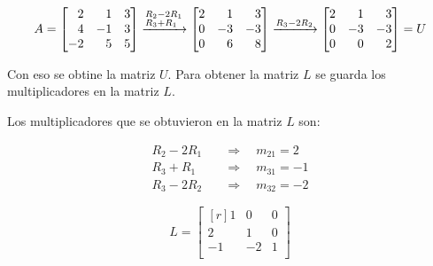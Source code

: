 \documentclass[../main.tex]{subfiles}
\begin{document}
        \begin{equation}
            A = \begin{bmatrix*}[r]
                    2 & 1 & 3 \\
                    4 & -1 & 3 \\
                    -2 & 5 & 5 \\
                \end{bmatrix*}  \xrightarrow[]{\begin{subarray}{l}
                    R_2 - 2R_1\\
                    R_3 +  R_1\\
                \end{subarray}}
                \begin{bmatrix*}[r]
                    2 & 1 & 3 \\
                    0 & -3 & -3 \\
                    0 & 6 & 8 \\
                \end{bmatrix*}
                \xrightarrow{R_3 - 2R_2}
                \begin{bmatrix*}[r]
                    2 & 1 & 3 \\
                    0 & -3 & -3 \\
                    0 & 0 & 2 \\
                \end{bmatrix*} = U
        \end{equation}

        Con eso se obtine la matriz $\textit{U}$. Para obtener la matriz $\textit{L}$ se guarda los multiplicadores en la matriz $\textit{L}$.

        Los multiplicadores que se obtuvieron en la matriz $\textit{L}$ son:
        
        \begin{equation}
            \begin{split}
            R_2 - 2R_1 &\quad \Rightarrow \quad m_{21} = 2\\
            R_3 +  R_1 &\quad \Rightarrow \quad m_{31} = -1\\
            R_3 - 2R_2 &\quad \Rightarrow \quad m_{32} = -2
            \end{split}
        \end{equation}


        \begin{equation}
            L = \begin{bmatrix*}[r]
                    1 & 0 & 0 \\
                    2 & 1 & 0 \\
                    -1 & -2 & 1 \\
            \end{bmatrix*}
        \end{equation}
\end{document}
